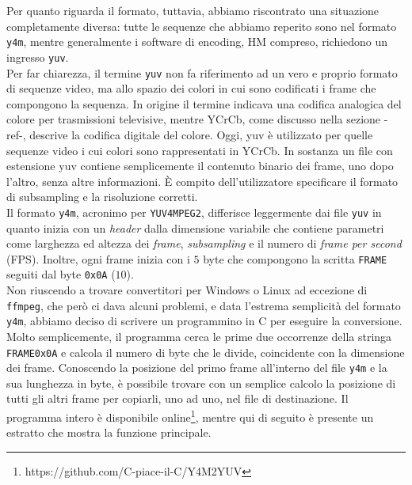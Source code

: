 Per quanto riguarda il formato, tuttavia, 
abbiamo riscontrato una situazione completamente diversa: tutte le sequenze che 
abbiamo reperito sono nel formato \verb|y4m|, mentre generalmente i software di 
encoding, HM compreso, richiedono un ingresso \verb|yuv|.\\
Per far chiarezza, il termine \verb|yuv| non fa riferimento ad un vero e 
proprio formato di sequenze video, ma allo spazio dei colori in cui sono 
codificati i frame che compongono la sequenza. In origine il termine indicava 
una codifica analogica del colore per trasmissioni televisive, mentre YCrCb, 
come discusso nella sezione -ref-, descrive la codifica digitale del colore. 
Oggi, yuv è utilizzato per quelle sequenze video i cui colori sono 
rappresentati in YCrCb.
In sostanza un file con estensione yuv contiene semplicemente il contenuto 
binario dei frame, uno dopo l'altro, senza altre informazioni. \`E compito 
dell'utilizzatore specificare il formato di subsampling e la risoluzione 
corretti. \\
Il formato \verb|y4m|, acronimo per \verb|YUV4MPEG2|, differisce leggermente 
dai file \verb|yuv| in quanto inizia con un \textit{header} dalla dimensione 
variabile che contiene parametri come larghezza ed altezza dei \textit{frame}, 
\textit{subsampling} e il numero di \textit{frame per second} (FPS). Inoltre, 
ogni frame inizia con i $5$ byte che compongono la scritta \verb|FRAME| seguiti 
dal byte \verb|0x0A| ($10$). \\
Non riuscendo a trovare convertitori per Windows o Linux ad eccezione di 
\verb|ffmpeg|, che però ci dava alcuni problemi, e data l'estrema semplicità 
del formato \verb|y4m|, abbiamo deciso di scrivere un programmino in C per 
eseguire la conversione. \\
Molto semplicemente, il programma cerca le prime due occorrenze della stringa   
\verb|FRAME0x0A| e calcola il numero di byte che le divide, coincidente con la 
dimensione dei frame. Conoscendo la posizione del primo frame all'interno del 
file \verb|y4m| e la sua lunghezza in byte, è possibile trovare con un semplice 
calcolo la posizione di tutti gli altri frame per copiarli, uno ad uno, nel 
file di destinazione.
Il programma intero è disponibile 
online\footnote{https://github.com/C-piace-il-C/Y4M2YUV}, mentre qui di seguito 
è presente un estratto che mostra la funzione principale. \\




